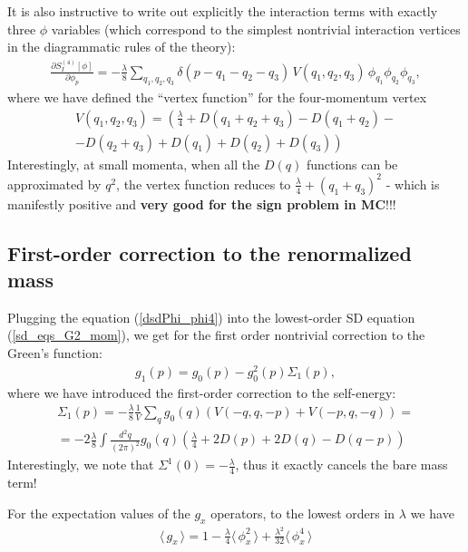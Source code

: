 \documentclass[12pt]{article}
\newcommand{\lr}[1]{ \left( #1 \right) }
\newcommand{\lrs}[1]{ \left[ #1 \right] }
\newcommand{\vev}[1]{ \langle \, #1 \, \rangle }
\begin{document}
It is also instructive to write out explicitly the interaction terms with exactly three $\phi$ variables (which correspond to the simplest nontrivial interaction vertices in the diagrammatic rules of the theory):
\begin{eqnarray}
\label{dsdPhi_phi4}
 \frac{\partial S_I^{\lr{4}}\lrs{\phi}}{\partial \phi_p}
 =
 - \frac{\lambda}{8}
 \sum\limits_{q_1, q_2, q_3}
 \delta\lr{p - q_1 - q_2 - q_3} \,
 V\lr{q_1, q_2, q_3} \,
 \phi_{q_1} \phi_{q_2} \phi_{q_3} ,
\end{eqnarray}
where we have defined the ``vertex function'' for the four-momentum vertex
\begin{eqnarray}
\label{vertex_function4}
 V\lr{q_1, q_2, q_3} =
 \left(\frac{\lambda}{4} + D\lr{q_1 + q_2 + q_3} - D\lr{q_1 + q_2}
 - \right. \nonumber \\ \left. -
 D\lr{q_2 + q_3} + D\lr{q_1} + D\lr{q_2} + D\lr{q_3}\right)
\end{eqnarray}
Interestingly, at small momenta, when all the $D\lr{q}$ functions can be approximated by $q^2$, the vertex function reduces to $\frac{\lambda}{4} + \lr{q_1 + q_3}^2$ - which is manifestly positive and \textbf{very good for the sign problem in MC}!!!

\subsection{First-order correction to the renormalized mass}

 Plugging the equation (\ref{dsdPhi_phi4}) into the lowest-order SD equation (\ref{sd_eqs_G2_mom}), we get for the first order nontrivial correction to the Green's function:
\begin{eqnarray}
\label{g1}
 g_1\lr{p} = g_0\lr{p} - g_0^2\lr{p} \Sigma_1\lr{p} ,
\end{eqnarray}
where we have introduced the first-order correction to the self-energy:
\begin{eqnarray}
\label{self_energy}
 \Sigma_1\lr{p} = - \frac{\lambda}{8} \frac{1}{V} \sum\limits_q g_0\lr{q} \lr{V\lr{-q, q, -p} + V\lr{-p, q, -q}}
 = \nonumber \\ =
 - 2 \frac{\lambda}{8} \int \frac{d^2 q}{\lr{2 \pi}^2} g_0\lr{q} \lr{\frac{\lambda}{4} + 2 D\lr{p} + 2 D\lr{q} - D\lr{q - p}}
\end{eqnarray}
Interestingly, we note that $\Sigma^1\lr{0} = -\frac{\lambda}{4}$, thus it exactly cancels the bare mass term!

For the expectation values of the $g_x$ operators, to the lowest orders in $\lambda$ we have
\begin{eqnarray}
\label{gx_vev_lowest}
 \vev{g_x} = 1 - \frac{\lambda}{4} \vev{\phi_x^2} + \frac{\lambda^2}{32} \vev{\phi_x^4}
\end{eqnarray}
\end{document}
